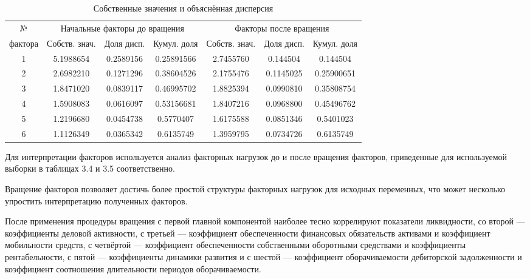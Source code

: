 \documentclass[14pt,a4paper]{extarticle}
\begin{document}
\begin{table}[H]
    \centering
    \caption{Собственные значения и объяснённая дисперсия}
    \label{tab:eigen}
    \small
    \begin{tabular}{c|ccc|ccc}
        \toprule
        № & \multicolumn{3}{c|}{Начальные факторы до вращения} & \multicolumn{3}{c}{Факторы после вращения} \\
        фактора & Собств. знач. & Доля дисп. & Кумул. доля & Собств. знач. & Доля дисп. & Кумул. доля \\
        \midrule
        1 & 5.1988654 & 0.2589156 & 0.25891566 & 2.7455760 & 0.144504 & 0.144504 \\
        2 & 2.6982210 & 0.1271296 & 0.38604526 & 2.1755476 & 0.1145025 & 0.25900651 \\
        3 & 1.8471020 & 0.0839117 & 0.46995702 & 1.8825394 & 0.0990810 & 0.35808754 \\
        4 & 1.5908083 & 0.0616097 & 0.53156681 & 1.8407216 & 0.0968800 & 0.45496762 \\
        5 & 1.2196680 & 0.0454738 & 0.5770407  & 1.6175588 & 0.0851346 & 0.5401023 \\
        6 & 1.1126349 & 0.0365342 & 0.6135749  & 1.3959795 & 0.0734726 & 0.6135749 \\
        \bottomrule
    \end{tabular}
\end{table}

Для интерпретации факторов используется анализ факторных нагрузок до и после вращения факторов, приведенные для используемой выборки в таблицах 3.4 и 3.5 соответственно.

Вращение факторов позволяет достичь более простой структуры факторных нагрузок для исходных переменных, что может несколько упростить интерпретацию полученных факторов.

После применения процедуры вращения с первой главной компонентой наиболее тесно коррелируют показатели ликвидности, со второй --- коэффициенты деловой активности, с третьей --- коэффициент обеспеченности финансовых обязательств активами и коэффициент мобильности средств, с четвёртой --- коэффициент обеспеченности собственными оборотными средствами и коэффициенты рентабельности, с пятой --- коэффициенты динамики развития и с шестой --- коэффициент оборачиваемости дебиторской задолженности и коэффициент соотношения длительности периодов оборачиваемости.

\end{document}
